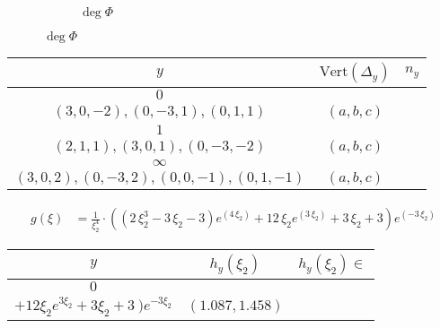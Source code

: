 {\begin{figure}[H]
{\begin{subfigure}[b]{0.40\textwidth}
	\caption*{$\deg \Phi $}
\end{subfigure}
}
\end{figure}
\begin{tabularx}{\textwidth}{|c|c|c}
\toprule
\(y\) & \(\text{Vert}(\Delta_y)\) & \(n_y\) \\
\midrule
\(0\) & \begin{tabular}{l} \((-3,0,1),(-2,1,1),(2,1,-1),\) \\ \hspace{1cm} \((3,0,-2),(0,-3,1),(0,1,1)\) \end{tabular} & \((a,b,c)\) \\ \midrule
\(1\) & \begin{tabular}{l} \((-3,0,1),(-2,1,1),(0,1,0),\) \\ \hspace{1cm} \((2,1,1),(3,0,1),(0,-3,-2)\) \end{tabular} & \((a,b,c)\) \\ \midrule
\(\infty\) & \begin{tabular}{l} \((-3,0,-1),(-2,1,-1),(2,1,1),\) \\ \hspace{1cm} \((3,0,2),(0,-3,2),(0,0,-1),(0,1,-1)\) \end{tabular} & \((a,b,c)\) \\
\midrule
\end{tabularx}
\begin{align*}
g(\xi) &= \frac{1}{\xi_{2}^{4}}\cdot\left({\left(2 \, \xi_{2}^{3} - 3 \, \xi_{2} - 3\right)} e^{\left(4 \, \xi_{2}\right)} + 12 \, \xi_{2} e^{\left(3 \, \xi_{2}\right)} + 3 \, \xi_{2} + 3\right) e^{\left(-3 \, \xi_{2}\right)}
\end{align*}
\begin{tabularx}{\textwidth}{|c|c|c}
\toprule
\(y\) & \( h_y(\xi_2)\) & \( h_y(\xi_2) \in\) \\
\midrule
\(0\) & \begin{tabular}{l} \(\frac{1}{3\xi_2^{4}} \cdot
 ( \ (2   \xi_2^{3} - 3   \xi_2 - 3) e^{4   \xi_2} \)   \\ \hspace{2cm} \(+12 \xi_2 e^{3 \xi_2} + 3 \xi_2 + 3 \ ) e^{-3 \xi_2}\) \end{tabular} & \((1.087,1.458)\) \\ \midrule

\end{tabularx}}
